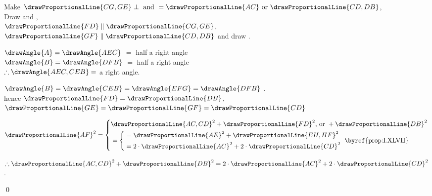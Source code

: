 \documentclass[booklanguage=english]{byrnebook}
\begin{document}
\begin{center}
Make $\drawProportionalLine{CG,GE} \perp \mbox{ and } = \drawProportionalLine{AC} \mbox{ or } \drawProportionalLine{CD,DB}$,\\
Draw  and ,\\
$\drawProportionalLine{FD} \parallel \drawProportionalLine{CG,GE}$, $ \drawProportionalLine{GF} \parallel \drawProportionalLine{CD,DB}$ and draw .

$\drawAngle{A} = \drawAngle{AEC}$  $=$ half a right angle \\
$\drawAngle{B} = \drawAngle{DFB}$  $=$ half a right angle \\
$\therefore \drawAngle{AEC,CEB} =$ a right angle.

$\drawAngle{B} = \drawAngle{CEB} = \drawAngle{EFG} = \drawAngle{DFB}$ .\\
hence $\drawProportionalLine{FD} = \drawProportionalLine{DB}$, $\drawProportionalLine{GE} = \drawProportionalLine{GF} = \drawProportionalLine{CD}$ 

$\drawProportionalLine{AF}^2 = \left\{
\begin{aligned}
&\drawProportionalLine{AC,CD}^2 + \drawProportionalLine{FD}^2 \mbox{, or } + \drawProportionalLine{DB}^2 \\
&= \left\{
	\begin{aligned}
		&= \drawProportionalLine{AE}^2 + \drawProportionalLine{EH,HF}^2 \\
		&= 2 \cdot \drawProportionalLine{AC}^2 + 2 \cdot \drawProportionalLine{CD}^2\\
	\end{aligned}
	\right. \mbox{ \byref{prop:I.XLVII}}
\end{aligned}\right.$

$\therefore \drawProportionalLine{AC,CD}^2 + \drawProportionalLine{DB}^2 = 2 \cdot \drawProportionalLine{AC}^2 + 2 \cdot \drawProportionalLine{CD}^2$.
\end{center}

\qed
\end{document}
